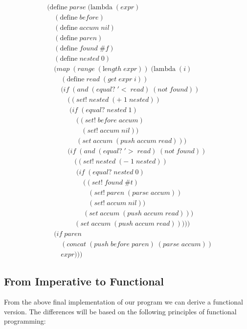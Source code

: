\begin{align*}
& (\text{define} \; parse \; (\text{lambda} \; (expr) \; 
\\& \quad (\text{define} \; before)
\\& \quad (\text{define} \; accum \; nil)
\\& \quad (\text{define} \; paren)
\\& \quad (\text{define} \; found \; \#f)
\\& \quad (\text{define} \; nested \; 0)
\\& \quad (map \; (range \; (\text{le}ngth \; expr)) \; (\text{lambda} \; (i)
\\& \qquad (\text{define} \; read \; (get \; expr \; i))
\\& \qquad (if \; (and \; (equal? \; '< \; read) \; (not \; found))
\\& \qquad \quad ((set! \; nested \; (+ \; 1 \; nested))
\\& \qquad \quad \; (if \; (equal? \; nested \; 1)
\\& \qquad \qquad \; ((set! \; before \; accum)
\\& \qquad \qquad \quad (set! \; accum \; nil))
\\& \qquad \qquad \; (set \; accum \; (push \; accum \; read)))
\\& \qquad \quad (if \; (and \; (equal? \; '> \; read) \; (not \; found))
\\& \qquad \qquad ((set! \; nested \; (- \; 1 \; nested))
\\& \qquad \qquad \; (if \; (equal? \; nested \; 0)
\\& \qquad \qquad \quad \; ((set! \; found \; \#t)
\\& \qquad \qquad \qquad (set! \; paren \; (parse \; accum))
\\& \qquad \qquad \qquad (set! \; accum \; nil))
\\& \qquad \qquad \quad \; (set \; accum \; (push \; accum \; read)))
\\& \qquad \qquad (set \; accum \; (push \; accum \; read)))))
\\& \quad (if \; paren
\\& \qquad (concat \; (push \; before \; paren) \; (parse \; accum))
\\& \qquad expr)))
\end{align*}

\subsection{From Imperative to Functional}
From the above final implementation of our program we can derive a functional 
version. The differences will be based on the following principles of functional 
programming:

